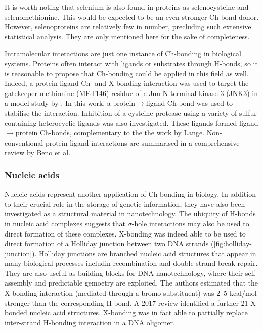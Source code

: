 \begin{refsection}
It is worth noting that selenium is also found in proteins as selenocysteine and selenomethionine.
This would be expected to be an even stronger Ch-bond donor.
However, selenoproteins are relatively few in number, precluding such extensive statistical analysis.\autocite{Iwaoka2015}
They are only mentioned here for the sake of completeness.

Intramolecular interactions are just one instance of Ch-bonding in biological systems.
Proteins often interact with ligands or substrates through H-bonds, so it is reasonable to propose that Ch-bonding could be applied in this field as well.
Indeed, a protein-ligand Ch- and X-bonding interaction was used to target the gatekeeper methionine (MET146) residue of c-Jun N-terminal kinase 3 (JNK3) in a model study by \citeauthor{Lange2015}.\autocite{Lange2015}
In this work, a protein$\rightarrow$ligand Ch-bond was used to stabilise the interaction.
Inhibition of a cysteine protease using a variety of sulfur-containing heterocyclic ligands was also investigated.\autocite{Giroud2017}
These ligands formed ligand$\rightarrow$protein Ch-bonds, complementary to the the work by Lange.
Non-conventional protein-ligand interactions are summarised in a comprehensive review by Beno et al.\autocite{Beno2015}

\subsubsection{Nucleic acids}
Nucleic acids represent another application of Ch-bonding in biology.
In addition to their crucial role in the storage of genetic information, they have also been investigated as a structural material in nanotechnology.
The ubiquity of H-bonds in nucleic acid complexes suggests that $\sigma$-hole interactions may also be used to direct formation of these complexes.
X-bonding was indeed able to be used to direct formation of a Holliday junction between two DNA strands (\cref{fig:holliday-junction}).\autocite{Voth2007}
Holliday junctions are branched nucleic acid structures that appear in many biological processes includin recombination and double-strand break repair.
They are also useful as building blocks for DNA nanotechnology, where their self assembly and predictable gemoetry are exploited.
The authors estimated that the X-bonding interaction (mediated through a bromo-substituent) was 2--5 kcal/mol stronger than the corresponding H-bond.
A 2017 review identified a further 21 X-bonded nucleic acid structures.\autocite{Kolar2017}
X-bonding was in fact able to partially replace inter-strand H-bonding interaction in a DNA oligomer.\autocite{Parker2012}


\end{refsection}
